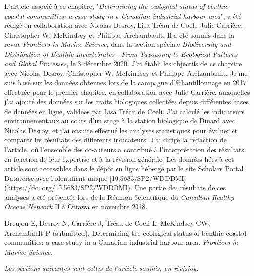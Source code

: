 L'article associé à ce chapitre, "\textit{Determining the ecological status of benthic coastal communities: a case study in a Canadian industrial harbour area}", a été rédigé en collaboration avec Nicolas Desroy, Lisa Tréau de Coeli, Julie Carrière, Christopher W. McKindsey et Philippe Archambault. Il a été soumis dans la revue \textit{Frontiers in Marine Science}, dans la section spéciale \textit{Biodiversity and Distribution of Benthic Invertebrates - From Taxonomy to Ecological Patterns and Global Processes}, le 3 décembre 2020. J'ai établi les objectifs de ce chapitre avec Nicolas Desroy, Christopher W. McKindsey et Philippe Archambault. Je me suis basé sur les données obtenues lors de la campagne d'échantillonnage en 2017 effectuée pour le premier chapitre, en collaboration avec Julie Carrière, auxquelles j'ai ajouté des données sur les traits biologiques collectées depuis différentes bases de données en ligne, validées par Lisa Tréau de Coeli. J'ai calculé les indicateurs environnementaux au cours d'un stage à la station biologique de Dinard avec Nicolas Desroy, et j'ai ensuite effectué les analyses statistiques pour évaluer et comparer les résultats des différents indicateurs. J'ai dirigé la rédaction de l'article, où l'ensemble des co-auteurs a contribué à l'interprétation des résultats en fonction de leur expertise et à la révision générale. Les données liées à cet article sont accessibles dans le dépôt en ligne hébergé par le site Scholars Portal Dataverse avec l'identifiant unique [10.5683/SP2/WDDDMI](https://doi.org/10.5683/SP2/WDDDMI). Une partie des résultats de ces analyses a été présentée lors de la Réunion Scientifique du \textit{Canadian Healthy Oceans Network} II à Ottawa en novembre 2018. \linebreak[4]

\begin{singlespace}
Dreujou E, Desroy N, Carrière J, Tréau de Coeli L, McKindsey CW, Archambault P (submitted). Determining the ecological status of benthic coastal communities: a case study in a Canadian industrial harbour area. \textit{Frontiers in Marine Science}.
\end{singlespace}

\textit{Les sections suivantes sont celles de l’article soumis, en révision.}
